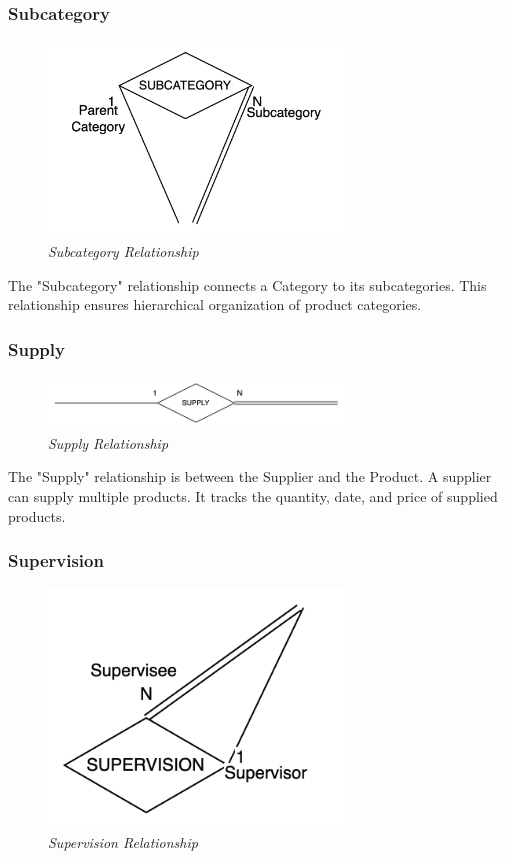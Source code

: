 \documentclass[11pt]{article}
\begin{document}
\subsubsection{Subcategory}
\begin{figure}[H]
  \centering
  \includegraphics[width=0.7\textwidth]{images/relationships/subcategory.png}
  \caption{\textit{Subcategory Relationship}}
\end{figure}

The "Subcategory" relationship connects a Category to its subcategories. This relationship ensures hierarchical organization of product categories.

\subsubsection{Supply}
\begin{figure}[H]
  \centering
  \includegraphics[width=0.7\textwidth]{images/relationships/supply.png}
  \caption{\textit{Supply Relationship}}
\end{figure}

The "Supply" relationship is between the Supplier and the Product. A supplier can supply multiple products. It tracks the quantity, date, and price of supplied products.

\subsubsection{Supervision}
\begin{figure}[H]
  \centering
  \includegraphics[width=0.7\textwidth]{images/relationships/supervision.png}
  \caption{\textit{Supervision Relationship}}
\end{figure}
\end{document}
